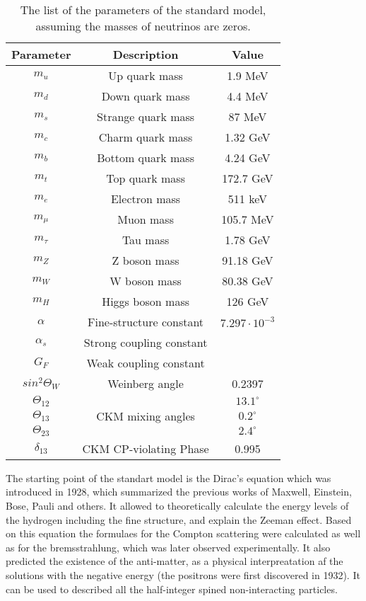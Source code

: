 \begin{table}[ht!]
\centering
\begin{tabular}{c|c|c} \hline\hline
Parameter & Description & Value \\\hline

$m_{u}$ & Up quark mass &  1.9 MeV \\
$m_{d}$ & Down quark mass & 4.4 MeV \\
$m_{s}$ & Strange quark mass & 87 MeV \\
$m_{c}$ & Charm quark mass & 1.32 GeV \\
$m_{b}$ & Bottom quark mass & 4.24 GeV \\
$m_{t}$ & Top quark mass & 172.7 GeV \\
\hline
$m_{e}$ & Electron mass & 511 keV \\
$m_{\mu}$ & Muon mass & 105.7 MeV \\
$m_{\tau}$ & Tau mass & 1.78 GeV \\
\hline
$m_{Z}$ & Z boson mass & 91.18 GeV \\
$m_{W}$ & W boson mass & 80.38 GeV \\
$m_{H}$ & Higgs boson mass & 126 GeV \\
\hline
$\alpha$ & Fine-structure constant & $7.297 \cdot 10^{-3}$\\
$\alpha_{s}$ & Strong coupling constant & \\
$G_{F}$ & Weak coupling constant & \\
\hline
$sin^{2} \Theta_{W}$ & Weinberg angle & 0.2397 \\
\hline
$\Theta_{12}$ &\multirow{3}{*}{CKM mixing angles}& $13.1^{\circ}$ \\
$\Theta_{13}$ && $0.2^{\circ}$ \\
$\Theta_{23}$ && $2.4^{\circ}$ \\
$\delta_{13}$ & CKM CP-violating Phase & 0.995 \\
\hline\hline
\end{tabular}
\caption{The list of the parameters of the standard model, assuming the masses of neutrinos are zeros.}
\label{tab:SM_parameters}
\end{table}


The starting point of the standart model is the Dirac's equation which was introduced in 1928, which summarized the previous works of Maxwell, Einstein, Bose, Pauli and others.
It allowed to theoretically calculate the energy levels of the hydrogen including the fine structure, and explain the Zeeman effect. Based on this equation the formulaes for the Compton scattering were calculated as well as for the bremsstrahlung, which was later observed experimentally. It also predicted the existence of the anti-matter, as a physical interpreatation af the solutions with the negative energy (the positrons were first discovered in 1932). It can be used to described all the half-integer spined non-interacting particles.

